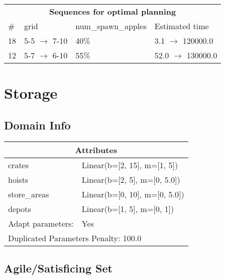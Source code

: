 \documentclass{article}
\begin{document}
                            \begin{center}
                            \begin{tabular}{l|l|l|l}
                            \multicolumn{4}{c}{\bf \large Sequences for optimal planning}\\
                            \# & grid & num\_spawn\_apples & Estimated time\\\midrule
                            18&5-5 $\rightarrow$ 7-10&40\%&3.1 $\rightarrow$ 120000.0\\
12&5-7 $\rightarrow$ 6-10&55\%&52.0 $\rightarrow$ 130000.0
                            \end{tabular}
                            \end{center}
                    \newpage \section{Storage}
                    \subsection*{Domain Info}

                    \begin{center}
                    \begin{tabular}{p{}p{}}
                    \multicolumn{2}{c}{\bf \large Attributes}\\\midrule
                    crates & Linear(b=[2, 15], m=[1, 5])\\
hoists & Linear(b=[2, 5], m=[0, 5.0])\\
store\_areas & Linear(b=[0, 10], m=[0, 5.0])\\
depots & Linear(b=[1, 5], m=[0, 1])
                    
                    \\\midrule
                    Adapt parameters: & Yes  
                
                     \\\midrule
                    \multicolumn{2}{l}{Duplicated Parameters Penalty: 100.0}
                    \end{tabular}
                    \end{center}
                
                         \subsection*{Agile/Satisficing Set}
\end{document}
